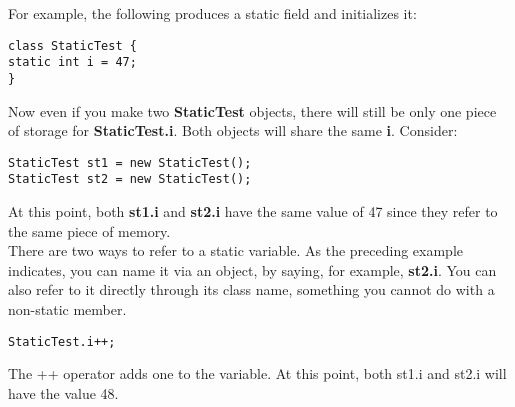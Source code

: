 \documentclass[10pt,letterpaper]{report}
\begin{document}
For example, the following produces a static field and initializes it:
\\
\begin{lstlisting}
class StaticTest {
static int i = 47;
}
\end{lstlisting}

Now even if you make two \textbf{StaticTest} objects, there will still be only one piece of storage for \textbf{StaticTest.i}. Both objects will share the same \textbf{i}. Consider:

\begin{lstlisting}
StaticTest st1 = new StaticTest();
StaticTest st2 = new StaticTest();
\end{lstlisting}

At this point, both \textbf{st1.i} and \textbf{st2.i} have the same value of 47 since they refer to the same piece of memory.
\\

There are two ways to refer to a static variable. As the preceding example indicates, you can name it via an object, by saying, for example, \textbf{st2.i}.
You can also refer to it directly through its class name, something you cannot do with a non-static member.

\begin{lstlisting}
StaticTest.i++;
\end{lstlisting}

The ++ operator adds one to the variable. At this point, both st1.i and st2.i will have the value 48.
\end{document}
